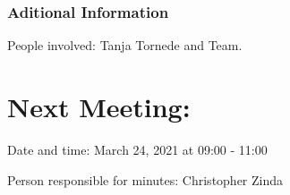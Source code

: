 \documentclass[11pt]{meetingmins} %
\begin{document}
\subsubsection{Aditional Information}
\begin{hiddensubitems}
    \item People involved: Tanja Tornede and Team.
\end{hiddensubitems}

\section{Next Meeting:}
\begin{hiddensubitems}
    \item Date and time: March 24, 2021 at 09:00 - 11:00
    \item Person responsible for minutes: Christopher Zinda
\end{hiddensubitems}
\end{document}
